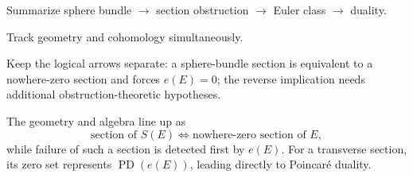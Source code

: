 \begin{exercise}\label{exr:viii32-24}
Summarize sphere bundle $\to$ section obstruction $\to$ Euler class $\to$ duality.
\end{exercise}
\begin{hint}
Track geometry and cohomology simultaneously.

Keep the logical arrows separate: a sphere-bundle section is equivalent to a nowhere-zero section and forces \(e(E)=0\); the reverse implication needs additional obstruction-theoretic hypotheses.
\end{hint}
\begin{solution}
The geometry and algebra line up as
\[
\text{section of }S(E)
\Longleftrightarrow
\text{nowhere-zero section of }E,
\]
while failure of such a section is detected first by \(e(E)\). For a transverse section, its zero set represents \(\operatorname{PD}(e(E))\), leading directly to Poincaré duality.
\end{solution}
